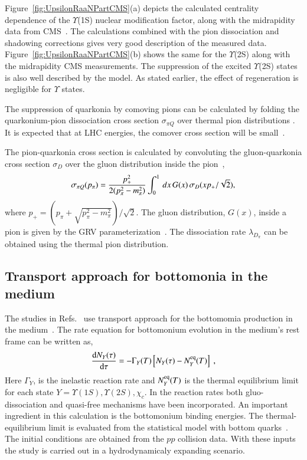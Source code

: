 {Figure~\ref{fig:UpsilonRaaNPartCMS}(a) depicts the calculated \cite{Kumar:2019xdj}
centrality dependence of the $\Upsilon$(1S) nuclear
modification factor, along with the midrapidity data from CMS~\cite{Sirunyan:2018nsz}.
The calculations combined with the pion dissociation and shadowing corrections 
gives very good description of the measured data. Figure~\ref{fig:UpsilonRaaNPartCMS}(b)
shows the same for the $\Upsilon$(2S) along with the midrapidity
CMS measurements. The suppression of the excited $\Upsilon$(2S) states 
is also well described by the model. As stated earlier, the effect of regeneration is
negligible for $\Upsilon$ states. 


  The suppression of quarkonia by comoving pions can be calculated by folding the quarkonium-pion
dissociation cross section $\sigma_{\pi Q}$ over thermal pion distributions \cite{Vogt:1988fj}. 
It is expected  that at LHC energies, the comover cross section will be small~\cite{Lourenco:2008sk}.
{\color{black}
The pion-quarkonia cross section is calculated by convoluting the gluon-quarkonia cross section $\sigma_D$
over the gluon distribution inside the pion~\cite{Arleo:2001mp},
\begin{equation}
\sigma_{\pi Q} (p_{\pi}) = {p_+^2 \over 2(p_\pi^2 - m_\pi^2)} \int_0^1 \, dx \, G(x) \, \sigma_D(xp_+/\sqrt {2}),
\end{equation}
where $p_+ = (p_\pi + \sqrt{p_\pi^2-m_\pi^2})/\sqrt{2}$. The gluon distribution, $G(x)$, inside a pion is 
given by the GRV parameterization~\cite{Gluck:1991ey}. 
The dissociation rate $\lambda_{D_{\pi}}$  can be obtained using the 
thermal pion distribution.


\subsection{Transport approach for bottomonia in the medium}
 The studies in Refs.~\cite{Grandchamp:2005yw,Rapp:2017chc} use 
transport approach for the bottomomia production in the medium~\cite{Grandchamp:2005yw,Rapp:2017chc}.
The rate equation for bottomonium evolution in the medium's rest frame
can be written as,
\begin{equation}
\frac{\mathrm{d} N_Y(\tau)}{\mathrm{d}\tau} =
-\Gamma_Y(T)\left[N_Y(\tau)-N^{\rm eq}_Y(T)\right] \ ,
\end{equation}
Here $\Gamma_Y$, is the inelastic reaction rate  and $N^{\rm eq}_Y(T)$ is the thermal
equilibrium limit  for each state $Y=\Upsilon(1S), \Upsilon(2S), \chi_c$.
In the reaction rates  both gluo-dissociation and quasi-free mechanisms have
been incorporated.  An important ingredient in this calculation is the bottomonium
binding energies. The thermal-equilibrium limit is evaluated from the statistical
model with bottom quarks~\cite{Grandchamp:2002wp}. 
The initial conditions are obtained from the $pp$ collision data. With these inputs the study is carried out in a hydrodynamicaly 
expanding scenario.  




}}
